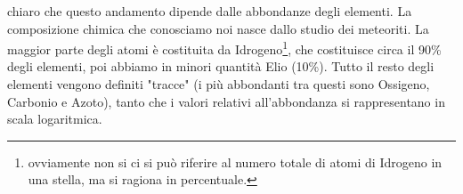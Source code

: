 \E chiaro che questo andamento dipende dalle abbondanze degli elementi. La composizione chimica che conosciamo noi nasce dallo studio dei meteoriti. La maggior parte degli atomi è costituita da Idrogeno\footnote{ovviamente non si ci si può riferire al numero totale di atomi di Idrogeno in una stella, ma si ragiona in percentuale.}, che costituisce circa il 90\% degli elementi, poi abbiamo in minori quantità Elio (10\%). Tutto il resto degli elementi vengono definiti "tracce" (i più abbondanti tra questi sono Ossigeno, Carbonio e Azoto), tanto che i valori relativi all'abbondanza si rappresentano in scala logaritmica.

